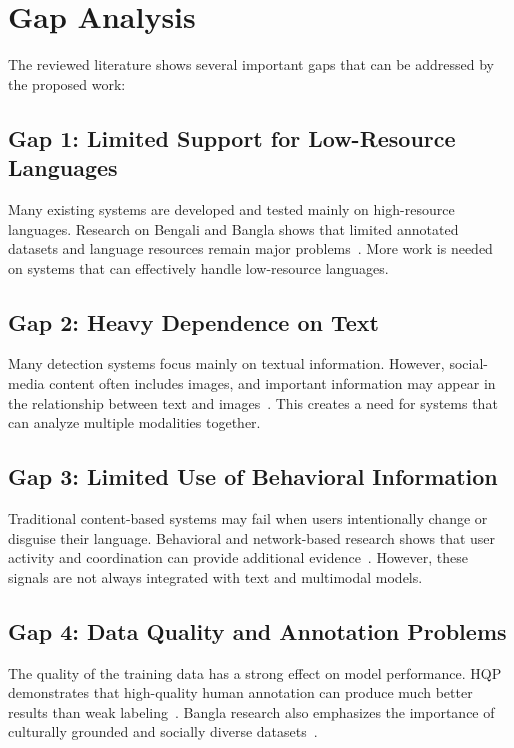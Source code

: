 \documentclass[12pt,a4paper]{report}
\begin{document}
\section{Gap Analysis}
The reviewed literature shows several important gaps that can be addressed by the
proposed work:

\subsection{Gap 1: Limited Support for Low-Resource Languages}
Many existing systems are developed and tested mainly on high-resource languages.
Research on Bengali and Bangla shows that limited annotated datasets and language
resources remain major problems~\cite{lora2023,hasan2026,romim2022}. More work is
needed on systems that can effectively handle low-resource languages.

\subsection{Gap 2: Heavy Dependence on Text}
Many detection systems focus mainly on textual information. However, social-media
content often includes images, and important information may appear in the
relationship between text and images~\cite{lin2024,hee2022}. This creates a need
for systems that can analyze multiple modalities together.

\subsection{Gap 3: Limited Use of Behavioral Information}
Traditional content-based systems may fail when users intentionally change or
disguise their language. Behavioral and network-based research shows that user
activity and coordination can provide additional
evidence~\cite{declerck2024,sela2025,schneider2026}. However, these signals are not
always integrated with text and multimodal models.

\subsection{Gap 4: Data Quality and Annotation Problems}
The quality of the training data has a strong effect on model performance. HQP
demonstrates that high-quality human annotation can produce much better results
than weak labeling~\cite{maarouf2024}. Bangla research also emphasizes the
importance of culturally grounded and socially diverse
datasets~\cite{hasan2026,romim2022}.
\end{document}
